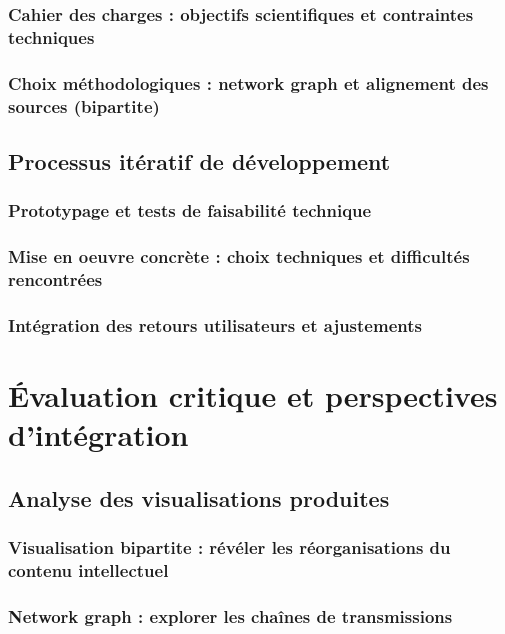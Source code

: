 \documentclass[a4paper,12pt,twoside]{book}
\newcommand{\clearemptydoublepage}{\newpage{\pagestyle{empty}\cleardoublepage}}
\begin{document}
	\section{Cahier des charges : objectifs scientifiques et contraintes techniques}

	\section{Choix méthodologiques : network graph et alignement des sources (bipartite)}

	\clearemptydoublepage

	\chapter{Processus itératif de développement}
	\section{Prototypage et tests de faisabilité technique}

	\section{Mise en oeuvre concrète : choix techniques et difficultés rencontrées}

	\section{Intégration des retours utilisateurs et ajustements}

	\clearemptydoublepage

	\part{Évaluation critique et perspectives d'intégration}
	\chapter{Analyse des visualisations produites}
	\section{Visualisation bipartite : révéler les réorganisations du contenu intellectuel}

	\section{Network graph : explorer les chaînes de transmissions}
\end{document}
